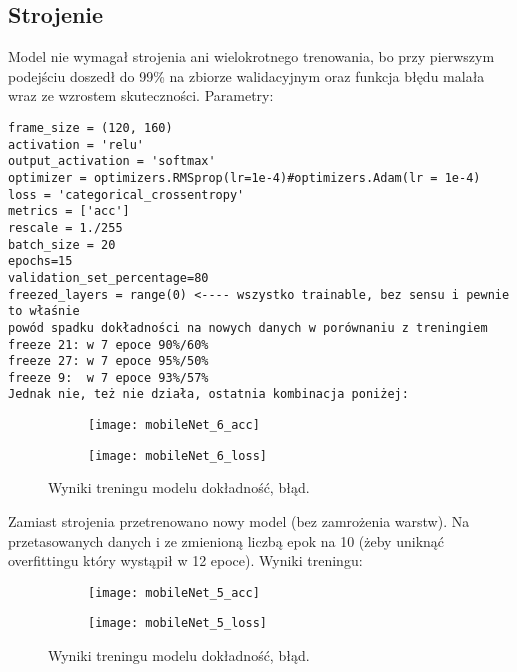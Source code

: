 \subsection{Strojenie}
Model nie wymagał strojenia ani wielokrotnego trenowania, bo przy pierwszym podejściu doszedł do 99\% na zbiorze walidacyjnym oraz funkcja błędu malała wraz ze wzrostem skuteczności.
Parametry:
\begin{verbatim}
frame_size = (120, 160)
activation = 'relu'
output_activation = 'softmax'
optimizer = optimizers.RMSprop(lr=1e-4)#optimizers.Adam(lr = 1e-4)
loss = 'categorical_crossentropy'
metrics = ['acc']
rescale = 1./255
batch_size = 20
epochs=15
validation_set_percentage=80
freezed_layers = range(0) <---- wszystko trainable, bez sensu i pewnie to właśnie 
powód spadku dokładności na nowych danych w porównaniu z treningiem
freeze 21: w 7 epoce 90%/60%
freeze 27: w 7 epoce 95%/50%
freeze 9:  w 7 epoce 93%/57%
Jednak nie, też nie działa, ostatnia kombinacja poniżej:
\end{verbatim}

\begin{figure}[h]
	\centering
	\begin{subfigure}{0.4\textwidth}
		\centering
		\texttt{[image: mobileNet\_6\_acc]}
		\subcaption{\label{subfigure_a}}
	\end{subfigure}
	\begin{subfigure}{0.4\textwidth}
		\centering
		\texttt{[image: mobileNet\_6\_loss]}
		\subcaption{\label{subfigure_b}}
	\end{subfigure}
	
	\caption{\label{fig:subcaption_example}Wyniki treningu modelu \protect{} dokładność, \protect{} błąd.}
\end{figure}


Zamiast strojenia przetrenowano nowy model (bez zamrożenia warstw). Na przetasowanych danych i ze zmienioną liczbą epok na 10 (żeby uniknąć overfittingu który wystąpił w 12 epoce). Wyniki treningu:

\begin{figure}[h]
	\centering
	\begin{subfigure}{0.4\textwidth}
		\centering
		\texttt{[image: mobileNet\_5\_acc]}
		\subcaption{\label{subfigure_a}}
	\end{subfigure}
	\begin{subfigure}{0.4\textwidth}
		\centering
		\texttt{[image: mobileNet\_5\_loss]}
		\subcaption{\label{subfigure_b}}
	\end{subfigure}
	
	\caption{\label{fig:subcaption_example}Wyniki treningu modelu \protect{} dokładność, \protect{} błąd.}
\end{figure}

